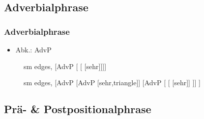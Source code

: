 \subsection{Adverbialphrase}

\begin{frame}
\frametitle{Adverbialphrase}

\begin{itemize}
	\item Abk.: AdvP
\end{itemize}

\begin{figure}[b]
	\begin{minipage}[b]{0.18\textwidth}
	\centering
	\footnotesize{
		\begin{forest}
		sm edges,
		[AdvP [ [ [sehr]]]]
		\end{forest}
		}
  	\end{minipage}  
  	\pause            
	\begin{minipage}[b]{0.03\textwidth}
	\hfill
  	\end{minipage}
	\begin{minipage}[b]{0.41\textwidth}
	\centering
	\footnotesize{
		\begin{forest}
		sm edges,
		[AdvP [AdvP [sehr,triangle]]
			[AdvP 
		    [	[]
			]]
		]			 
		\end{forest}
		}
  	\end{minipage}
\end{figure}
\end{frame}


\subsection{Prä- \& Postpositionalphrase}

